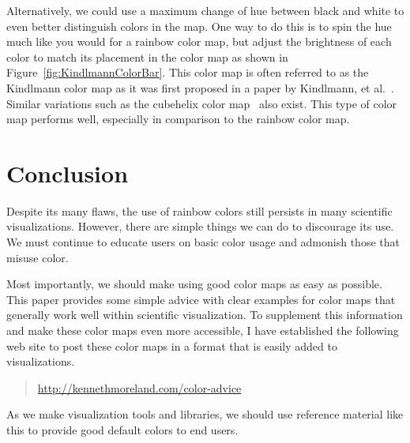 \documentclass[letterpaper,twocolumn,fleqn]{article}
\newcommand*{\lcite}[1]{~\cite{#1}}
\newcommand*{\scite}[1]{~\cite{#1}}
\newcommand{\etal}{et al.\xspace}
\newcommand{\fix}[1]{}
\begin{document}
Alternatively, we could use a maximum change of hue between black and white
to even better distinguish colors in the map. One way to do this is to spin
the hue much like you would for a rainbow color map, but adjust the
brightness of each color to match its placement in the color map as shown
in Figure~\ref{fig:KindlmannColorBar}. This color map is often referred to
as the Kindlmann color map as it was first proposed in a paper by
Kindlmann, \etal\scite{Kindlmann2002}. Similar variations such as the
cubehelix color map\lcite{Green2011} also exist. This type of color map
performs well, especially in comparison to the rainbow color map.




\section{Conclusion}

\noindent
Despite its many flaws, the use of rainbow colors still persists in many
scientific visualizations. However, there are simple things we can do to
discourage its use. We must continue to educate users on basic color usage
and admonish those that misuse color.

Most importantly, we should make using good color maps as easy as possible.
This paper provides some simple advice with clear examples for color maps
that generally work well within scientific visualization. To supplement
this information and make these color maps even more accessible, I have
established the following web site to post these color maps in a format
that is easily added to visualizations.

\begin{quote}
  \url{http://kennethmoreland.com/color-advice}
\end{quote}

\fix{Actually make this web page.}

As we make visualization tools and libraries, we should use reference
material like this to provide good default colors to end users.
\end{document}
